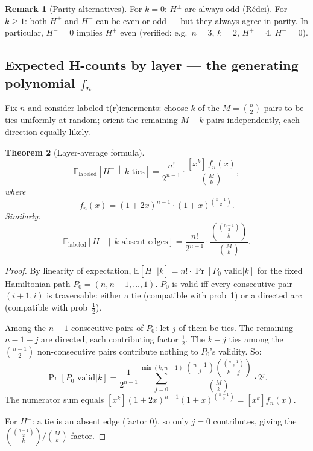 \documentclass[12pt,reqno]{amsart}
\newtheorem{theorem}{Theorem}[section]
\theoremstyle{definition}
\newtheorem{remark}[theorem]{Remark}
\theoremstyle{plain}
\begin{document}
\begin{remark}[Parity alternatives]
For $k=0$: $H^\pm$ are always odd (Rédei).
For $k\ge 1$: both $H^+$ and $H^-$ can be even or odd — but they always agree
in parity.  In particular, $H^-=0$ implies $H^+$ even (verified: e.g.\ $n=3$,
$k=2$, $H^+=4$, $H^-=0$).
\end{remark}

\subsection{Expected H-counts by layer — the generating polynomial \texorpdfstring{$f_n$}{f\_n}}
\label{ssec:expected-H}

Fix $n$ and consider labeled t(r)ienerments: choose $k$ of the $M=\binom{n}{2}$
pairs to be ties uniformly at random; orient the remaining $M-k$ pairs
independently, each direction equally likely.

\begin{theorem}[Layer-average formula]\label{thm:layer-avg}
\[
  \mathbb{E}_{\text{labeled}}\!\left[H^+\,\middle|\,k\text{ ties}\right]
  =\frac{n!}{2^{n-1}}\cdot
  \frac{[x^k]\,f_n(x)}{\binom{M}{k}},
\]
where
\[
  f_n(x)=(1+2x)^{n-1}\cdot(1+x)^{\binom{n-1}{2}}.
\]
Similarly:
\[
  \mathbb{E}_{\text{labeled}}\!\left[H^-\,\middle|\,k\text{ absent edges}\right]
  =\frac{n!}{2^{n-1}}\cdot
  \frac{\binom{\binom{n-1}{2}}{k}}{\binom{M}{k}}.
\]
\end{theorem}

\begin{proof}
By linearity of expectation, $\mathbb{E}[H^+|k]=n!\cdot\Pr[P_0\text{ valid}|k]$
for the fixed Hamiltonian path $P_0=(n,n-1,\ldots,1)$.
$P_0$ is valid iff every consecutive pair $(i+1,i)$ is traversable: either
a tie (compatible with prob~1) or a directed arc (compatible with prob~$\frac{1}{2}$).

Among the $n-1$ consecutive pairs of $P_0$: let $j$ of them be ties.
The remaining $n-1-j$ are directed, each contributing factor $\frac{1}{2}$.
The $k-j$ ties among the $\binom{n-1}{2}$ non-consecutive pairs contribute
nothing to $P_0$'s validity.  So:
\[
  \Pr[P_0\text{ valid}|k]=\frac{1}{2^{n-1}}\sum_{j=0}^{\min(k,n-1)}
  \frac{\binom{n-1}{j}\binom{\binom{n-1}{2}}{k-j}}{\binom{M}{k}}\cdot 2^j.
\]
The numerator sum equals $[x^k](1+2x)^{n-1}(1+x)^{\binom{n-1}{2}}=[x^k]f_n(x)$.

For $H^-$: a tie is an absent edge (factor 0), so only $j=0$ contributes,
giving the $\binom{\binom{n-1}{2}}{k}/\binom{M}{k}$ factor.
\end{proof}
\end{document}
